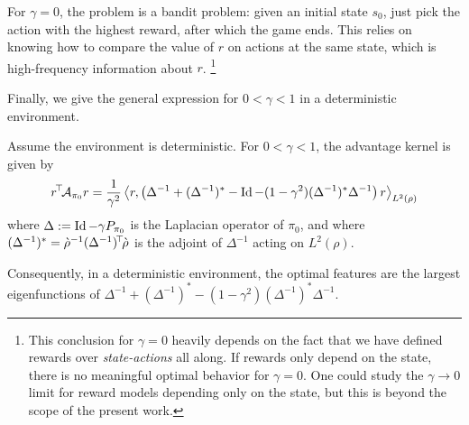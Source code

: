 \documentclass[11pt,a4paper]{article}
\newcommand{\AK}{\mathcal{A}}
\newcommand{\drho}{\grave \rho}
\newcommand{\TODO}[1]{{\color{red} TODO: {#1}}}
\newcommand{\option}[1]{{\color[rgb]{.4,0,.8}[Optional:#1]}} %
\renewcommand{\TODO}[1]{}
\renewcommand{\option}[1]{}  %
\begin{document}
For $\gamma=0$, the problem is a bandit problem: given an initial state
$s_0$, just pick the action with the highest reward, after which the game
ends. This relies on knowing how to compare the value of $r$ on actions
at the same state, which is high-frequency information about $r$.
\footnote{This conclusion for $\gamma=0$ heavily depends on the fact that we have
defined rewards over \emph{state-actions} all along. If rewards only
depend on the state, there is no meaningful optimal behavior for
$\gamma=0$. One could study the $\gamma\to 0$ limit for reward models
depending only on the state, but this is beyond the scope of the present
work.}

\bigskip

Finally, we give the general expression for $0<\gamma<1$ in a
deterministic environment.

\begin{thm}
\label{thm:gen}
Assume the environment is deterministic.
For $0<\gamma<1$, the advantage kernel is given by
\begin{align*}
\transp{r}\AK_{\pi_0}r=
\frac1{\gamma^2}\left\langle r, \left(\Delta^{-1}+(\Delta^{-1})^{\ast}-\Id-(1-\gamma^2)
(\Delta^{-1})^\ast \Delta^{-1}\right)r\right\rangle_{L^2(\rho)}
\end{align*}
where $\Delta\mathrel{\mathop{:}}= \operatorname{Id}-\gamma P_{\pi_0}$ is the Laplacian operator of $\pi_0$,
and where $(\Delta^{-1})^\ast=\drho^{-1}\transp{(\Delta^{-1})}\drho$ is the adjoint of $\Delta^{-1}$ acting on
$L^2(\rho)$.


Consequently, in a deterministic environment, the optimal features are
the largest eigenfunctions of 
$\Delta^{-1}+(\Delta^{-1})^{\ast}-(1-\gamma^2)
(\Delta^{-1})^\ast \Delta^{-1}$.
\end{thm}


\option{
\section{The Advantage Kernel and Natural Policy Gradient}

\TODO{}

Finally, the advantage kernel gives the performance improvement along natural policy gradient
trajectories (Theorem \TODO{}): if $(\pi_t)_{t\geq 0}$ is the family of
policies learned by natural policy gradient on a reward $r$, then
\begin{equation}
\frac{\d}{\d t} \E_{\rho_t} [r]=\transp{r}\AK_{\pi_t} r
\end{equation}
where $\rho_t$ is the invariant distribution of $\pi_t$.

\TODO{} move Theorem~\ref{thm:return} here?
}
\end{document}
